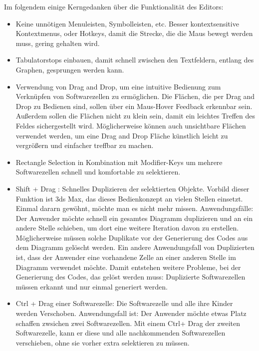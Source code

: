 \documentclass[a4paper,12pt,oneside]{book}
\begin{document}
\bigskip
Im folgendem einige Kerngedanken über die Funktionalität des Editors:

\begin{itemize}
\item Keine unnötigen Menuleisten, Symbolleisten, etc. Besser kontextsensitive
Kontextmenus, oder Hotkeys,  damit die Strecke, die die Maus bewegt werden muss, gering
gehalten wird.
\item Tabulatorstops einbauen, damit schnell zwischen den Textfeldern, entlang des
Graphen, gesprungen werden kann.
\item Verwendung von Drag and Drop, um eine intuitive Bedienung zum Verknüpfen von
Softwarezellen zu ermöglichen. Die Flächen, die per Drag and Drop zu Bedienen
sind, sollen über ein Maus-Hover Feedback erkennbar sein. Außerdem sollen die
Flächen nicht zu klein sein, damit ein leichtes Treffen des Feldes
sichergestellt wird. Möglicherweise können auch unsichtbare Flächen verwendet
werden, um eine Drag and Drop Fläche künstlich leicht zu vergrößern und einfacher treffbar zu machen.
\item Rectangle Selection in Kombination mit Modifier-Keys um mehrere Softwarezellen
schnell und komfortable zu selektieren.
\item Shift + Drag : Schnelles Duplizieren der selektierten Objekte. Vorbild dieser
Funktion ist 3ds Max, das dieses Bedienkonzept an vielen Stellen einsetzt.
Einmal dararn gewöhnt, möchte man es nicht mehr missen. Anwendungsfälle:
Der Anwender möchte  schnell ein gesamtes Diagramm duplizieren und an ein andere Stelle schieben, um
dort eine weitere Iteration davon zu erstellen. Möglicherweise müssen solche
Duplikate vor der Generierung des Codes aus dem Diagramm gelöscht werden.
Ein andere Anwendungsfall von Duplizierten ist, dass der Anwender eine vorhandene
Zelle an einer anderen Stelle im Diagramm verwendet möchte. Damit
entstehen weitere Probleme, bei der Generierung des Codes, das gelöst werden
muss: Duplizierte Softwarezellen müssen erkannt und nur einmal generiert werden.
\item Ctrl + Drag einer Softwarezelle: Die Softwarezelle und alle ihre Kinder werden
Verschoben. Anwendungsfall ist: Der Anwender möchte etwas Platz schaffen
zwsichen zwei Softwarezellen. Mit einem Ctrl+ Drag der zweiten Softwarezelle,
kann er diese und alle nachkommenden Softwarezellen verschieben, ohne sie
vorher extra selektieren zu müssen.
\end{itemize}
\end{document}
